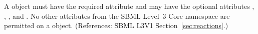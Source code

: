 A \LocalParameter object must have the required attribute  and
may have the optional attributes , ,
,  and .  No other attributes from
the SBML Level~3 Core namespace are permitted on a \LocalParameter object.
(References: SBML L3V1 Section~\ref{sec:reactions}.)

